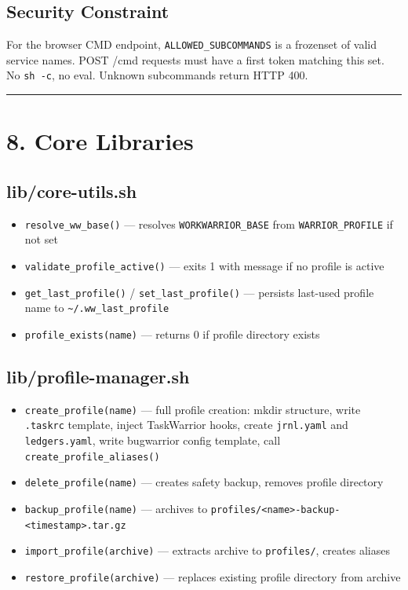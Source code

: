 \documentclass[
]{article}
\providecommand{\tightlist}{%
  \setlength{\itemsep}{0pt}\setlength{\parskip}{0pt}}
\begin{document}
\subsection{Security Constraint}\label{security-constraint}

For the browser CMD endpoint, \texttt{ALLOWED\_SUBCOMMANDS} is a
frozenset of valid service names. POST /cmd requests must have a first
token matching this set. No \texttt{sh\ -c}, no eval. Unknown
subcommands return HTTP 400.

\begin{center}\rule{0.5\linewidth}{0.5pt}\end{center}

\section{8. Core Libraries}\label{core-libraries}

\subsection{lib/core-utils.sh}\label{libcore-utils.sh}

\begin{itemize}
\tightlist
\item
  \texttt{resolve\_ww\_base()} --- resolves \texttt{WORKWARRIOR\_BASE}
  from \texttt{WARRIOR\_PROFILE} if not set
\item
  \texttt{validate\_profile\_active()} --- exits 1 with message if no
  profile is active
\item
  \texttt{get\_last\_profile()} / \texttt{set\_last\_profile()} ---
  persists last-used profile name to
  \texttt{\textasciitilde{}/.ww\_last\_profile}
\item
  \texttt{profile\_exists(name)} --- returns 0 if profile directory
  exists
\end{itemize}

\subsection{lib/profile-manager.sh}\label{libprofile-manager.sh}

\begin{itemize}
\tightlist
\item
  \texttt{create\_profile(name)} --- full profile creation: mkdir
  structure, write \texttt{.taskrc} template, inject TaskWarrior hooks,
  create \texttt{jrnl.yaml} and \texttt{ledgers.yaml}, write bugwarrior
  config template, call \texttt{create\_profile\_aliases()}
\item
  \texttt{delete\_profile(name)} --- creates safety backup, removes
  profile directory
\item
  \texttt{backup\_profile(name)} --- archives to
  \texttt{profiles/\textless{}name\textgreater{}-backup-\textless{}timestamp\textgreater{}.tar.gz}
\item
  \texttt{import\_profile(archive)} --- extracts archive to
  \texttt{profiles/}, creates aliases
\item
  \texttt{restore\_profile(archive)} --- replaces existing profile
  directory from archive
\end{itemize}
\end{document}
